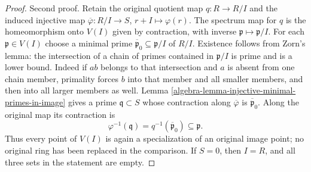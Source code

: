 \begin{proof}
\medskip\noindent
Second proof. Retain the original quotient map
$q:R\to R/I$ and the induced injective map
$\overline\varphi:R/I\to S$, $r+I\mapsto\varphi(r)$.
The spectrum map for $q$ is the homeomorphism onto
$V(I)$ given by contraction, with inverse
$\mathfrak p\mapsto\mathfrak p/I$.
For each $\mathfrak p\in V(I)$ choose a minimal prime
$\overline{\mathfrak p}_0\subseteq\mathfrak p/I$
of $R/I$. Existence follows from Zorn's lemma: the
intersection of a chain of primes contained in
$\mathfrak p/I$ is prime and is a lower bound.
Indeed if $ab$ belongs to that intersection and $a$
is absent from one chain member, primality forces
$b$ into that member and all smaller members, and
then into all larger members as well.
Lemma \ref{algebra-lemma-injective-minimal-primes-in-image}
gives a prime $\mathfrak q\subset S$ whose contraction
along $\overline\varphi$ is $\overline{\mathfrak p}_0$.
Along the original map its contraction is
$$
\varphi^{-1}(\mathfrak q)
=q^{-1}(\overline{\mathfrak p}_0)\subseteq\mathfrak p.
$$
Thus every point of $V(I)$ is again a specialization
of an original image point; no original ring has been
replaced in the comparison. If $S=0$, then $I=R$,
and all three sets in the statement are empty.
\end{proof}